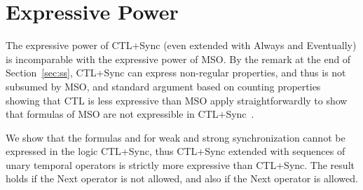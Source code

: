 \documentclass{article}
\begin{document}
\section{Expressive Power}\label{sec:expressivity}

The expressive power of CTL+Sync (even extended with Always and Eventually) 
is incomparable with the expressive power of MSO. 
By the remark at the end of Section~\ref{sec:ss}, CTL+Sync can express non-regular
properties, and thus is not subsumed by MSO, and standard argument based on counting properties~\cite{Wolper83}
showing that CTL is less expressive than MSO apply straightforwardly to show that 
formulas of MSO are not expressible in CTL+Sync~\cite{CGP01}.

We show that the formulas  and  for weak and strong synchronization
cannot be expressed in the logic CTL+Sync, thus CTL+Sync extended with sequences of unary 
temporal operators is strictly more expressive than CTL+Sync. 
The result holds if the Next operator is not allowed, and also if the 
Next operator is allowed.
\end{document}
